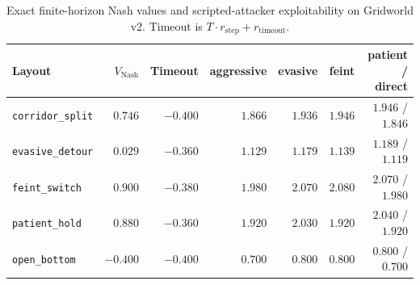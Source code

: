 \documentclass[11pt]{article}
\begin{document}
\begin{table}[t]
\centering
\caption{Exact finite-horizon Nash values and scripted-attacker exploitability on Gridworld v2. Timeout is $T\cdot r_{\mathrm{step}}+r_{\mathrm{timeout}}$.}
\label{tab:exact-nash}
\setlength{\tabcolsep}{4pt}
\begin{tabular}{lrrrrrr}
\toprule
Layout & $V_{\mathrm{Nash}}$ & Timeout & aggressive & evasive & feint & patient / direct \\
\midrule
\texttt{corridor\_split} & $0.746$ & $-0.400$ & $1.866$ & $1.936$ & $1.946$ & $1.946$ / $1.846$ \\
\texttt{evasive\_detour} & $0.029$ & $-0.360$ & $1.129$ & $1.179$ & $1.139$ & $1.189$ / $1.119$ \\
\texttt{feint\_switch} & $0.900$ & $-0.380$ & $1.980$ & $2.070$ & $2.080$ & $2.070$ / $1.980$ \\
\texttt{patient\_hold} & $0.880$ & $-0.360$ & $1.920$ & $2.030$ & $1.920$ & $2.040$ / $1.920$ \\
\texttt{open\_bottom} & $-0.400$ & $-0.400$ & $0.700$ & $0.800$ & $0.800$ & $0.800$ / $0.700$ \\
\bottomrule
\end{tabular}
\end{table}
\end{document}
